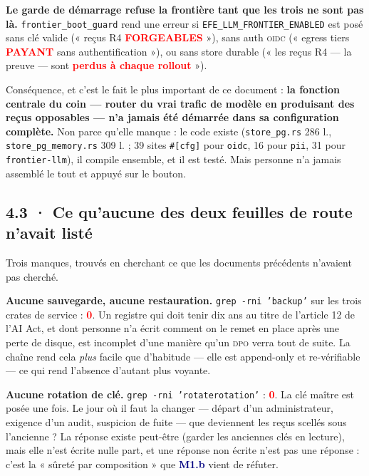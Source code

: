 \documentclass[10pt]{article}
\newcommand{\pire}[1]{\textcolor{red}{\textbf{#1}}}
\newcommand{\code}[1]{\texttt{\small #1}}
\newcommand{\mm}[1]{\textbf{\textcolor{navy}{#1}}}
\begin{document}
\begin{alerte}
\textbf{Le garde de démarrage refuse la frontière tant que les trois ne sont pas là.}
\code{frontier\_boot\_guard} rend une erreur si \code{EFE\_LLM\_FRONTIER\_ENABLED} est posé sans clé
valide (« reçus R4 \pire{FORGEABLES} »), sans auth \textsc{oidc} (« egress tiers \pire{PAYANT} sans
authentification »), ou sans store durable (« les reçus R4 --- la preuve --- sont \pire{perdus à
chaque rollout} »).

Conséquence, et c'est le fait le plus important de ce document : \textbf{la fonction centrale du coin
--- router du vrai trafic de modèle en produisant des reçus opposables --- n'a jamais été démarrée
dans sa configuration complète.} Non parce qu'elle manque : le code existe
(\code{store\_pg.rs} 286 l., \code{store\_pg\_memory.rs} 309 l. ; 39 sites \code{\#[cfg]} pour
\code{oidc}, 16 pour \code{pii}, 31 pour \code{frontier-llm}), il compile ensemble, et il est testé.
Mais personne n'a jamais assemblé le tout et appuyé sur le bouton.
\end{alerte}

\subsection{4.3 · Ce qu'aucune des deux feuilles de route n'avait listé}

Trois manques, trouvés en cherchant ce que les documents précédents n'avaient pas cherché.

\textbf{Aucune sauvegarde, aucune restauration.} \code{grep -rni 'backup'} sur les trois crates de
service : \pire{0}. Un registre qui doit tenir dix ans au titre de l'article 12 de l'AI Act, et dont
personne n'a écrit comment on le remet en place après une perte de disque, est incomplet d'une
manière qu'un \textsc{dpo} verra tout de suite. La chaîne rend cela \emph{plus} facile que d'habitude
--- elle est append-only et re-vérifiable --- ce qui rend l'absence d'autant plus voyante.

\textbf{Aucune rotation de clé.} \code{grep -rni 'rotate\textbar rotation'} : \pire{0}. La clé maître
est posée une fois. Le jour où il faut la changer --- départ d'un administrateur, exigence d'un
audit, suspicion de fuite --- que deviennent les reçus scellés sous l'ancienne ? La réponse existe
peut-être (garder les anciennes clés en lecture), mais elle n'est écrite nulle part, et une réponse
non écrite n'est pas une réponse : c'est la « sûreté par composition » que \mm{M1.b} vient de
réfuter.
\end{document}
